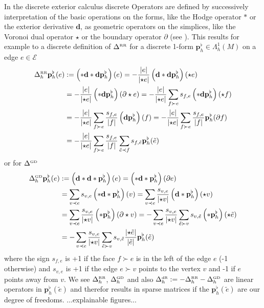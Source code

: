 \documentclass{scrartcl}
\newcommand{\exd}{\mathbf{d}}
\newcommand{\pflh}{\mathbf{p}^{\flat}_{h}}
\newcommand{\LB}{\Delta^{\text{\tiny RR}}}
\newcommand{\LCB}{\Delta^{\text{\tiny GD}}}
\newcommand{\LDR}{\Delta^{\text{\tiny dR}}}
\newcommand{\LBh}{\LB_{h}}
\newcommand{\LCBh}{\LCB_{h}}
\newcommand{\LDRh}{\LDR_{h}}
\newcommand{\E}{\mathcal{E}}
\begin{document}
    In the discrete exterior calculus discrete Operators are defined by successively interpretation of the basic operations on the forms, 
    like the Hodge operator \( * \) or the exterior derivative \( \exd \), as geometric operators on the simplices, 
    like the Voronoi dual operator \( \star \) or the boundary operator \( \partial \) (see \cite{hirani}).
    This results for example to a discrete definition of \( \LB \) for a discrete 1-form \( \pflh\in\Lambda^{1}_{h}(M) \) on a edge 
    \(e\in\E \)
    \begin{align}
      \LBh\pflh(e) &:=  \left(*\exd*\exd \pflh\right)(e)
                     = -\frac{\left| e \right|}{\left| \star e \right|} \left(\exd * \exd  \pflh\right)(\star e) \\
                    &=  -\frac{\left| e \right|}{\left| \star e \right|} \left(* \exd  \pflh\right)(\partial\star e)
                     = -\frac{\left| e \right|}{\left| \star e \right|} \sum_{f\succ e} s_{f,e} \left(* \exd \pflh\right) (\star f) \\
                    &= -\frac{\left| e \right|}{\left| \star e \right|} \sum_{f\succ e} \frac{s_{f,e}}{\left| f \right|} 
                                \left(\exd\pflh\right)(f)
                     = -\frac{\left| e \right|}{\left| \star e \right|} \sum_{f\succ e} \frac{s_{f,e}}{\left| f \right|} \pflh(\partial f)\\
                    &= -\frac{\left| e \right|}{\left| \star e \right|} \sum_{f\succ e} \frac{s_{f,e}}{\left| f \right|}
                                \sum_{\tilde{e}\prec f} s_{f,\tilde{e}} \pflh(\tilde{e})
    \end{align}
    or for \( \LCB \)
    \begin{align}
      \LCBh\pflh(e) &:= \left( \exd * \exd * \pflh\right) (e)
                      = \left( * \exd *\pflh \right) (\partial e) \\
                     &= \sum_{v\prec e} s_{v,e} \left( * \exd * \pflh \right)(v) 
                      = \sum_{v\prec e} \frac{s_{v,e}}{\left| \star v \right|} \left( \exd * \pflh \right)(\star v)\\
                     &= \sum_{v\prec e} \frac{s_{v,e}}{\left| \star v \right|} \left( * \pflh \right)(\partial\star v)
                      = -\sum_{v\prec e} \frac{s_{v,e}}{\left| \star v \right|} \sum_{\tilde{e}\succ v}
                                s_{v,\tilde{e}} \left( * \pflh \right) (\star \tilde{e}) \\
                     &= -\sum_{v\prec e} \frac{s_{v,e}}{\left| \star v \right|} \sum_{\tilde{e}\succ v}
                                s_{v,\tilde{e}} \frac{\left| \star\tilde{e} \right|}{\left| \tilde{e} \right|}\pflh(\tilde{e})
    \end{align}
    where the sign \( s_{f,e} \) is +1 if the face \( f\succ e \) is in the left of the edge \( e \) (-1 otherwise)
    and \( s_{v,e} \) is +1 if the edge \( e\succ v \) points to the vertex \( v \) and -1 if \( e \) points away from \( v \).
    We see \( \LBh \), \( \LCBh \) and also \( \LDRh := -\LBh -\LCBh \) are linear operators in \( \pflh(\tilde{e}) \)
    and therefor results in sparse matrices if the \( \pflh(\tilde{e}) \) are our degree of freedoms.
    ...explainable figures...
\end{document}
